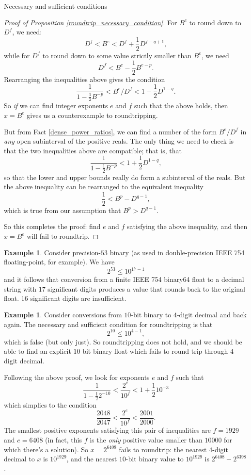 \documentclass{article}
\theoremstyle{plain}
\theoremstyle{definition}
\newtheorem{example}[lemma]{Example}
\begin{document}
\begin{section}{Necessary and sufficient conditions}
\begin{proof}[Proof of Proposition \ref{roundtrip_necessary_condition}]
  For $B^e$ to round down to $D^f$, we need:
  $$D^f < B^e < D^f + \frac12 D^{f-q+1},$$ while for $D^f$ to round down to
  some value strictly smaller than $B^e$, we need
  $$D^f < B^e - \frac12 B^{e-p}.$$
  Rearranging the inequalities above gives the condition
  $$\frac{1}{1 - \frac12 B^{-p}} < B^e / D^f < 1 + \frac12 D^{1-q}.$$ So
  \emph{if} we can find integer exponents $e$ and $f$ such that the above
  holds, then $x=B^e$ gives us a counterexample to roundtripping.

  But from Fact \ref{dense_power_ratios}, we can find a number of the form $B^e
  / D^f$ in \emph{any} open subinterval of the positive reals. The only thing
  we need to check is that the two inequalities above are compatible; that is,
  that
  $$\frac{1}{1 - \frac12 B^{-p}} < 1 + \frac12 D^{1-q},$$
  so that the lower and upper bounds really do form a subinterval of the reals.
  But the above inequality can be rearranged to the equivalent inequality
  $$\frac12 < B^{p} - D^{q-1},$$
  which is true from our assumption that $B^p > D^{q-1}$.

  So this completes the proof: find $e$ and $f$ satisfying the above
  inequality, and then $x = B^e$ will fail to roundtrip.
\end{proof}

\begin{example}
  Consider precision-$53$ binary (as used in double-precision IEEE 754
  floating-point, for example). We have
  $$2^{53} \le 10^{17 - 1}$$ and it follows that conversion from a finite IEEE
  754 binary64 float to a decimal string with $17$ significant digits produces
  a value that rounds back to the original float. $16$ significant digits are
  insufficient.
\end{example}

\begin{example}
  Consider conversions from $10$-bit binary to $4$-digit decimal and back
  again.  The necessary and sufficient condition for roundtripping is that
  $$2^{10} \le 10^{4-1},$$ which is false (but only just). So roundtripping
  does not hold, and we should be able to find an explicit $10$-bit binary
  float which fails to round-trip through $4$-digit decimal.

  Following the above proof, we look for exponents $e$ and $f$ such that
  $$\frac{1}{1 - \frac12 2^{-10}} < \frac{2^e}{10^f} < 1 + \frac12 10^{-3}$$
  which simplies to the condition
  $$\frac{2048}{2047} < \frac{2^e}{10^f} < \frac{2001}{2000}.$$ The smallest
  positive exponents satisfying this pair of inequalities are $f=1929$ and
  $e=6408$ (in fact, this $f$ is the \emph{only} positive value smaller than
  $10000$ for which there's a solution). So $x = 2^{6408}$ fails to roundtrip:
  the nearest $4$-digit decimal to $x$ is $10^{1929}$, and the nearest $10$-bit
  binary value to $10^{1929}$ is $2^{6408} - 2^{6398}$.


\end{example}
\end{section}
\end{document}
